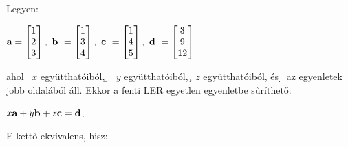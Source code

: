 \documentclass[a4paper,11.5pt]{article}
\begin{document}
	\noindent Legyen:
	
	{\centering
		$\a=
		\begin{bmatrix}
		1\s \\
		2\s \\
		3\s \\
		\end{bmatrix},~
		\b~=
		\begin{bmatrix}
		1\s \\
		3\s \\
		4\s \\
		\end{bmatrix},~
		\c~=
		\begin{bmatrix}
		1\s \\
		4\s \\
		5\s \\
		\end{bmatrix},~
		\d~=
		\begin{bmatrix}
		3\s \\
		9\s \\
		12\s \\
		\end{bmatrix}$
	\par}
	
	\noindent ahol \a~$x$ együtthatóiból, \b~ $y $ együtthatóiból, \c~$z$ együtthatóiból, és \d~az egyenletek jobb oldalából áll. Ekkor a fenti LER egyetlen egyenletbe sűríthető:
	
	{\centering
		$x\textbf{a} + y\textbf{b} + z\textbf{c} = \textbf{d}$.
	\par}
	
	\noindent E kettő ekvivalens, hisz:
	
\end{document}
